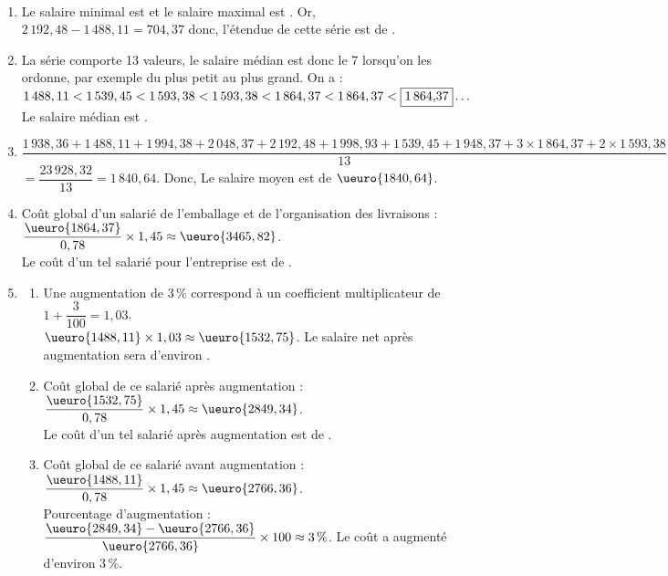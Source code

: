 \begin{corrige}
\ \\ [-5mm]
   \begin{enumerate}
      \item Le salaire minimal est  et le salaire maximal est . Or, $2\,192,48-1\,488,11 =704,37$ donc, {\blue l'étendue de cette série est de }.
      \item La série comporte 13 valeurs, le salaire médian est donc le 7 lorsqu'on les ordonne, par exemple du plus petit au plus grand. On a : $1\,488,11 < 1\,539,45 <1\,593,38 < 1\,593,38 < 1\,864,37 < 1\,864,37 < \fbox{1\,864,37}\dots$ \\
         {\blue Le salaire médian est }. \smallskip
      \item $\dfrac{1\,938,36+1\,488,11+1\,994,38+2\,048,37+2\,192,48+1\,998,93+1\,539,45+1\,948,37+3\times1\,864,37+2\times1\,593,38}{13}$ \\
         $=\dfrac{23\,928,32}{13} =1\,840,64$. Donc, {\blue Le salaire moyen est de $\ueuro{1840,64}$}.
      \item Coût global d'un salarié de l'emballage et de l'organisation des livraisons : $\dfrac{\ueuro{1864,37}}{0,78}\times1,45 \approx\ueuro{3465,82}$. \\
         {\blue Le coût d'un tel salarié pour l'entreprise est de }.
      \item 
         \begin{enumerate}
            \item Une augmentation de 3\,\% correspond à un coefficient multiplicateur de $1+\dfrac{3}{100} =1,03$. \\ [1mm]
               $\ueuro{1488,11}\times1,03 \approx\ueuro{1532,75}$. {\blue Le salaire net après augmentation sera d'environ }. \smallskip
            \item Coût global de ce salarié après augmentation : $\dfrac{\ueuro{1532,75}}{0,78}\times1,45 \approx\ueuro{2849,34}$. \\ [1mm]
              {\blue Le coût d'un tel salarié après augmentation est de }. \smallskip
           \item Coût global de ce salarié avant augmentation : $\dfrac{\ueuro{1488,11}}{0,78}\times1,45 \approx\ueuro{2766,36}$. \\ [1mm]
              Pourcentage d'augmentation : $\dfrac{\ueuro{2849,34}-\ueuro{2766,36}}{\ueuro{2766,36}}\times100 \approx 3\,\%$. {\blue Le coût a augmenté d'environ 3\,\%}.
        \end{enumerate}
  \end{enumerate}
\end{corrige}

